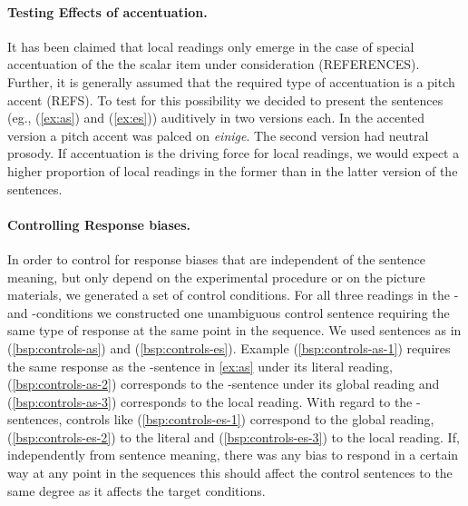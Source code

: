 \documentclass[fleqn,reqno,10pt,draft]{article}
\newcommand{\as}{\acro{as}}
\renewcommand{\es}{\acro{es}}
\begin{document}
\paragraph{Testing Effects of accentuation.} It has been claimed that
local readings only emerge in the case of special accentuation of the
the scalar item under consideration (REFERENCES). Further, it is
generally assumed that the required type of accentuation is a pitch
accent (REFS). To test for this possibility we decided to present the
sentences (eg., (\ref{ex:as}) and (\ref{ex:es})) auditively in two
versions each. In the accented version a pitch accent was palced on
{\it einige}. The second version had neutral prosody. If accentuation
is the driving force for local readings, we would expect a higher
proportion of local readings in the former than in the latter version
of the sentences.

\paragraph{Controlling Response biases.} In order to control for
response biases that are independent of the sentence meaning, but only
depend on the experimental procedure or on the picture materials, we
generated a set of control conditions. For all three readings in the
\as- and \es-conditions we constructed one unambiguous control sentence
requiring the same type of response at the same point in the
sequence. We used sentences as in (\ref{bsp:controls-as}) and
(\ref{bsp:controls-es}). Example (\ref{bsp:controls-as-1}) requires
the same response as the \as-sentence in \ref{ex:as} under its literal
reading, (\ref{bsp:controls-as-2}) corresponds to the \as-sentence
under its global reading and (\ref{bsp:controls-as-3}) corresponds to
the local reading. With regard to the \es-sentences, controls like
(\ref{bsp:controls-es-1}) correspond to the global reading,
(\ref{bsp:controls-es-2}) to the literal and
(\ref{bsp:controls-es-3}) to the local reading.  If, independently
from sentence meaning, there was any bias to respond in a certain way
at any point in the sequences this should affect the control sentences
to the same degree as it affects the target conditions.
\end{document}
